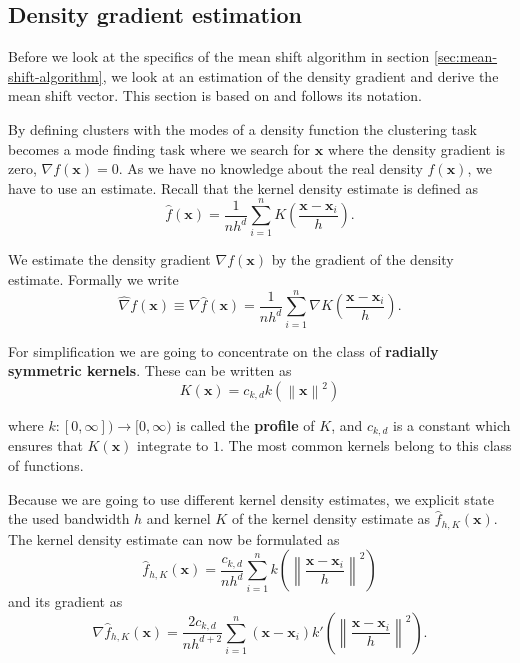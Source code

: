 \documentclass{article}
\newcommand{\norm}[1]{\left\lVert#1\right\rVert}
\begin{document}
\subsection{Density gradient estimation} \label{sec:density-gradient-estimation}

Before we look at the specifics of the mean shift algorithm in section \ref{sec:mean-shift-algorithm}, we look at an estimation of the density gradient and derive the mean shift vector. This section is based on \cite{Comaniciu.2002} and follows its notation.

By defining clusters with the modes of a density function the clustering task becomes a mode finding task where we search for $\bm{x}$ where the density gradient is zero, $\nabla f(\bm{x}) = 0$. As we have no knowledge about the real density $f(\bm{x})$, we have to use an estimate. Recall that the kernel density estimate is defined as
\begin{equation}
	\hat{f}(\bm{x}) = \frac{1}{nh^d} \sum_{i=1}^n K\left(\frac{\bm{x} - \bm{x}_i}{h} \right)\text{.}
	\label{eq:kernel-density-estimate-2}
\end{equation}

We estimate the density gradient $\nabla f(\bm{x})$ by the gradient of the density estimate. Formally we write
\begin{equation}
	\hat\nabla f(\bm{x}) \equiv \nabla \hat{f}(\bm{x}) = \frac{1}{nh^d} \sum_{i=1}^n \nabla K\left(\frac{\bm{x} - \bm{x}_i}{h} \right)\text{.}
	\label{eq:kernel-density-gradient-estimate}
\end{equation}

For simplification we are going to concentrate on the class of \textbf{radially symmetric kernels}. These can be written as
\begin{equation}
	K(\bm{x}) = c_{k,d} k(\norm{\bm{x}}^2)
\end{equation}

where $k : [0, \infty]) \rightarrow [0, \infty)$ is called the \textbf{profile} of $K$, and $c_{k,d}$ is a constant which ensures that $K(\bm{x})$ integrate to $1$. The most common kernels belong to this class of functions.

Because we are going to use different kernel density estimates, we explicit state the used bandwidth $h$ and kernel $K$ of the kernel density estimate as $\hat{f}_{h,K}(\bm{x})$. The kernel density estimate can now be formulated as
\begin{equation}
	\hat{f}_{h,K}(\bm{x}) = \frac{c_{k,d}}{nh^d} \sum_{i=1}^n k\left(\norm{\frac{\bm{x} - \bm{x}_i}{h}}^2 \right)
\end{equation}
and its gradient as
\begin{equation}
	\nabla \hat{f}_{h,K}(\bm{x}) = \frac{2c_{k,d}}{nh^{d+2}} \sum_{i=1}^n (\bm{x} - \bm{x}_i)k'\left(\norm{\frac{\bm{x} - \bm{x}_i}{h}}^2 \right)\text{.}
\end{equation}
\end{document}
